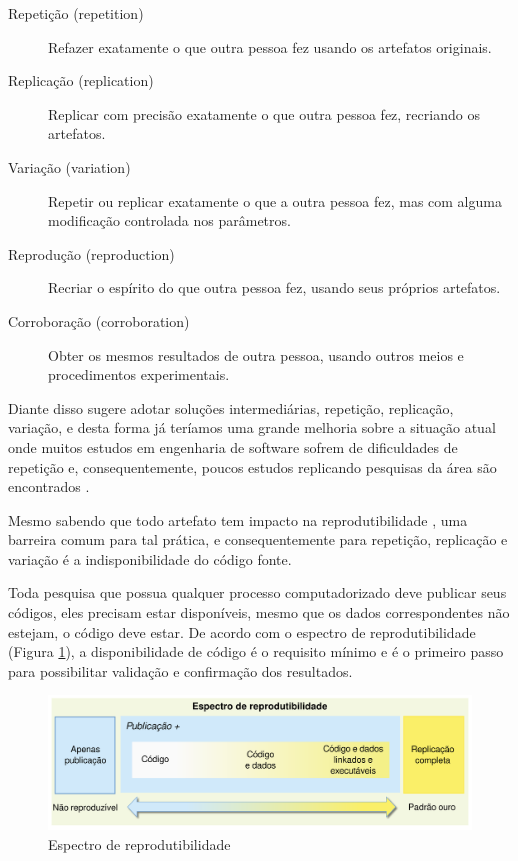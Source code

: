 \begin{description}

  \item[Repetição (repetition)]
  Refazer exatamente o que outra pessoa fez usando os artefatos originais.

  \item[Replicação (replication)]
  Replicar com precisão exatamente o que outra pessoa fez, recriando os
  artefatos.

  \item[Variação (variation)]
  Repetir ou replicar exatamente o que a outra pessoa fez, mas com alguma
  modificação controlada nos parâmetros.

  \item[Reprodução (reproduction)]
  Recriar o espírito do que outra pessoa fez, usando seus próprios artefatos.

  \item[Corroboração (corroboration)]
  Obter os mesmos resultados de outra pessoa, usando outros meios e
  procedimentos experimentais.

\end{description}

Diante disso  sugere adotar soluções
intermediárias, repetição, replicação, variação, e desta forma já teríamos uma
grande melhoria sobre a situação atual onde muitos estudos em engenharia de
software sofrem de dificuldades de repetição \cite{tang2016worthiness} e,
consequentemente, poucos estudos replicando pesquisas da área são encontrados
\cite{silva_replication_2011}.

Mesmo sabendo que todo artefato tem impacto na reprodutibilidade
\cite{gonzalez_reproducibility_2012}, uma barreira comum para tal prática, e
consequentemente para repetição, replicação e variação é a indisponibilidade do
código fonte.

Toda pesquisa que possua qualquer processo computadorizado deve
publicar seus códigos, eles precisam estar disponíveis, mesmo que os dados
correspondentes não estejam, o código deve estar. De acordo com o espectro de
reprodutibilidade (Figura \ref{reproducibility-spectrum}), a disponibilidade de
código é o requisito mínimo e é o primeiro passo para possibilitar validação e
confirmação dos resultados.

\begin{figure}[h]
  \center
  \includegraphics[scale=0.35]{imagens/reproducibility-spectrum-ptbr.png}
  \caption{Espectro de reprodutibilidade \cite{peng2011reproducible}}
  \label{reproducibility-spectrum}
\end{figure}


